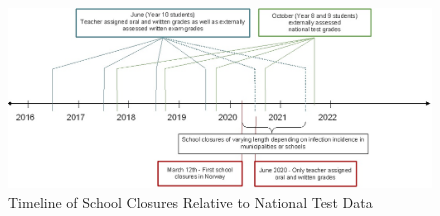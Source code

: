 \begin{figure}[h]
    \caption{Timeline of School Closures Relative to National Test Data}
    \label{fig:timeline}
    \centering
    \includegraphics{timeline.jpg}
\end{figure}
